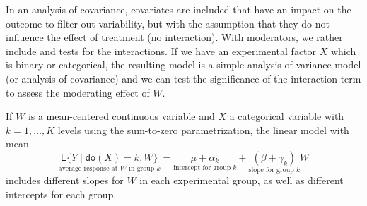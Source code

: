\documentclass[
  11pt,
  letterpaper,
]{scrbook}
\theoremstyle{definition}
\theoremstyle{definition}
\theoremstyle{remark}
\begin{document}
In an analysis of covariance, covariates are included that have an
impact on the outcome to filter out variability, but with the assumption
that they do not influence the effect of treatment (no interaction).
With moderators, we rather include and tests for the interactions. If we
have an experimental factor \(X\) which is binary or categorical, the
resulting model is a simple analysis of variance model (or analysis of
covariance) and we can test the significance of the interaction term to
assess the moderating effect of \(W\).

If \(W\) is a mean-centered continuous variable and \(X\) a categorical
variable with \(k=1, \ldots, K\) levels using the sum-to-zero
parametrization, the linear model with mean \[
\underset{\text{average response at $W$ in group $k$}}{\mathsf{E}\{Y \mid \mathsf{do}(X) = k, W\}} = \underset{\text{intercept for group $k$}}{\mu + \alpha_k} + \underset{\text{slope for group $k$}}{(\beta + \gamma_k)}W
\] includes different slopes for \(W\) in each experimental group, as
well as different intercepts for each group.
\end{document}
